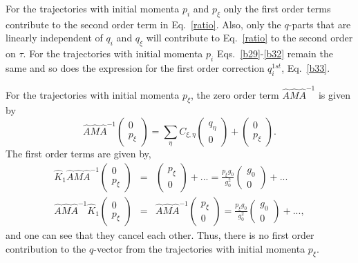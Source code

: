 \documentclass[journal=jpcafh,manuscript=article]{achemso}
\begin{document}
For the trajectories with initial momenta $p_i$ and $p_\xi$ only
the first order terms contribute to the second order term in
Eq.~\ref{ratio}. Also, only the $q$-parts that are linearly
independent of $q_i$ and $q_\xi$ will contribute to Eq.~\ref{ratio} to
the second order on $\tau$. For the trajectories with
initial momenta $p_i$ Eqs.~\ref{b29}-\ref{b32} remain the same and so
does the expression for the first order correction $q^{1st}_i$,
Eq.~\ref{b33}.

For the trajectories with initial momenta $p_\xi$, the zero order term
$\hat{A}\hat{M}\hat{A}^{-1}$ is given by
\begin{equation}
  \label{c16}
  \hat{A}\hat{M}\hat{A}^{-1}\left(\begin{array}{c}0\\p_\xi\end{array}\right)
  = \sum_{\eta}C_{\xi,\eta}\left(\begin{array}{c}q_\eta\\0\end{array}\right)+\left(\begin{array}{c}0\\p_\xi\end{array}\right).
 \end{equation}
The first order terms are given by,
\begin{eqnarray}
  \label{c17}
  \hat{K}_1\hat{A}\hat{M}\hat{A}^{-1}\left(\begin{array}{c}0\\p_\xi\end{array}\right)
  &=&\left(\begin{array}{c}p_\xi\\0\end{array}\right)+...
  =\frac{p_{\xi}g_0}{g_0^2}\left(\begin{array}{c}g_0\\0\end{array}\right)+...
  \\
  \label{c18}
  \hat{A}\hat{M}\hat{A}^{-1}\hat{K}_1\left(\begin{array}{c}0\\p_\xi\end{array}\right)
  &=&\hat{A}\hat{M}\hat{A}^{-1}\left(\begin{array}{c}p_\xi\\0\end{array}\right)
 =\frac{p_{\xi}g_0}{g_0^2}\left(\begin{array}{c}g_0\\0\end{array}\right)+...,
\end{eqnarray}
and one can see that they cancel each other. Thus, there is no first order
contribution to the $q$-vector from the trajectories with initial momenta $p_\xi$.
\end{document}
